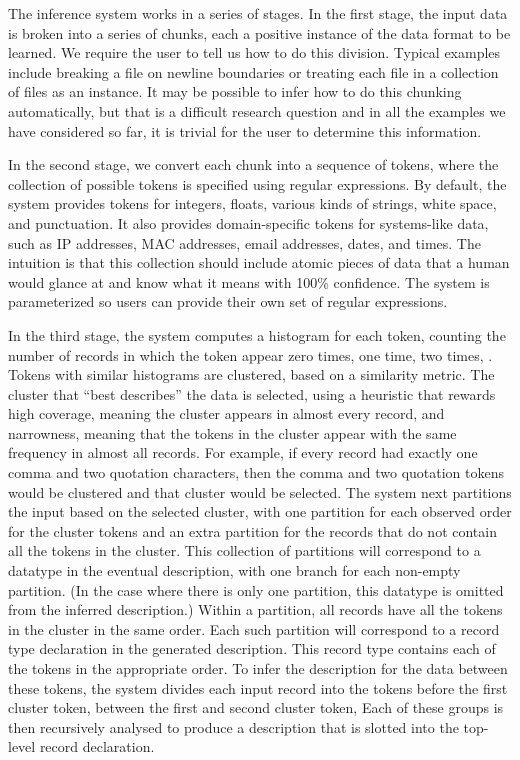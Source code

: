 \documentclass{sig-alternate}
\begin{document}
The inference system works in a series of stages.  In the first stage,
the input data is broken into a series of chunks, each a positive
instance of the data format to be learned.  We require the user to
tell us how to do this division.  Typical examples include breaking a
file on newline boundaries or treating each file in a collection of
files as an instance.  It may be possible to infer how to do this
chunking automatically, but that is a difficult research question and
in all the examples we have considered so far, it is trivial for the
user to determine this information. 

In the second stage, we convert each chunk into a sequence of tokens,
where the collection of possible tokens is specified using regular
expressions.  By default, the system provides tokens for integers,
floats, various kinds of strings, white space, and punctuation.  It
also provides domain-specific tokens for systems-like data, such as IP
addresses, MAC addresses, email addresses, dates, and times.  The
intuition is that this collection should include atomic pieces of data
that a human would glance at and know what it means with 100\%
confidence.   The system is parameterized so users can provide their
own set of regular expressions. 

In the third stage, the system computes a histogram for each token,
counting the number of records in which the token appear zero times,
one time, two times, \etc.  Tokens with similar histograms are
clustered, based on a similarity metric.  The cluster that ``best
describes'' the data is selected, using a heuristic that rewards high
coverage, meaning the cluster appears in almost every record, and
narrowness, meaning that the tokens in the cluster appear with the
same frequency in almost all records.  For example, if every record
had exactly one comma and two quotation characters, then the comma and
two quotation tokens would be clustered and that cluster would be
selected.  The system next partitions the input based on the selected
cluster, with one partition for each observed order for the cluster
tokens and an extra partition for the records that do not contain all
the tokens in the cluster.  This collection of partitions will
correspond to a datatype in the eventual description, with one branch
for each non-empty partition.  (In the case where there is only one
partition, this datatype is omitted from the inferred description.)
Within a partition, all records have all the tokens in the cluster in
the same order.  Each such partition will correspond to a record type
declaration in the generated description. This record type contains
each of the tokens in the appropriate order.  To infer the description
for the data between these tokens, the system divides each input
record into the tokens before the first cluster token, between the
first and second cluster token, \etc{} Each of these groups is then
recursively analysed to produce a description that is slotted into the
top-level record declaration.
\end{document}
